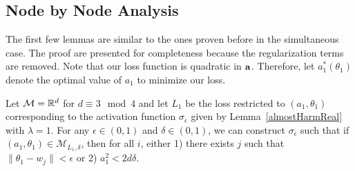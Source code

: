 \subsection{Node by Node Analysis}

The first few lemmas are similar to the ones proven before in the simultaneous case. The proof are presented for completeness because the regularization terms are removed. Note that our loss function is quadratic in $\bf{ a}$. Therefore, let $a_1^*(\theta_1)$ denote the optimal value of $a_1$ to minimize our loss. 

\begin{lemma}\label{nodeConv}
Let $\mathcal{M} = {\mathbb{R}}^d$ for $d \equiv 3 \mod 4$ and let $L_1$ be the loss restricted to $(a_1,\theta_1)$ corresponding to the activation function $\sigma_\epsilon$ given by Lemma~\ref{almostHarmReal} with $\lambda = 1$. For any $\epsilon \in (0,1)$ and $\delta \in (0, 1)$, we can construct $\sigma_\epsilon$ such that if ${(a_1,\theta_1)} \in \mathcal{M}_{L_1,\delta}$, then for all $i$, either 1) there exists $j$ such that $\|\theta_1 - w_j\| < \epsilon$ or 2) $a_1^2 < 2d\delta$.
\end{lemma}

